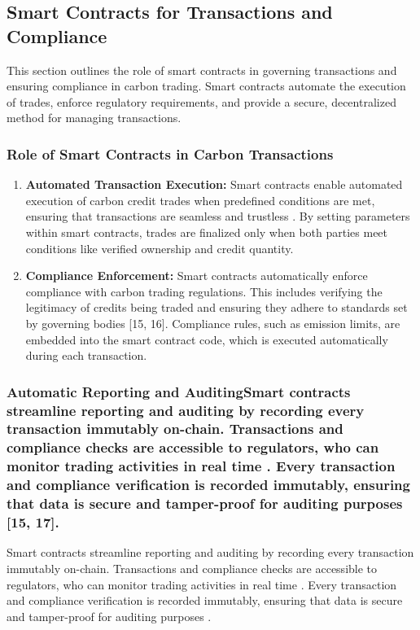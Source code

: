\documentclass[preprint,12pt]{elsarticle}
\begin{document}
\subsection{Smart Contracts for Transactions and Compliance}
This section outlines the role of smart contracts in governing transactions and ensuring compliance in carbon trading. Smart contracts automate the execution of trades, enforce regulatory requirements, and provide a secure, decentralized method for managing transactions.
\subsubsection{Role of Smart Contracts in Carbon Transactions}
\begin{enumerate}
    \item \textbf{Automated Transaction Execution:}
Smart contracts enable automated execution of carbon credit trades when predefined conditions are met, ensuring that transactions are seamless and trustless \citep{buterin2014next}. By setting parameters within smart contracts, trades are finalized only when both parties meet conditions like verified ownership and credit quantity.
\item \textbf{Compliance Enforcement:}
Smart contracts automatically enforce compliance with carbon trading regulations. This includes verifying the legitimacy of credits being traded and ensuring they adhere to standards set by governing bodies [15, 16]. Compliance rules, such as emission limits, are embedded into the smart contract code, which is executed automatically during each transaction.
\end{enumerate}
\subsubsection{Automatic Reporting and AuditingSmart contracts streamline reporting and auditing by recording every transaction immutably on-chain. Transactions and compliance checks are accessible to regulators, who can monitor trading activities in real time \citep{parikh2022smart}. Every transaction and compliance verification is recorded immutably, ensuring that data is secure and tamper-proof for auditing purposes [15, 17].}
Smart contracts streamline reporting and auditing by recording every transaction immutably on-chain. Transactions and compliance checks are accessible to regulators, who can monitor trading activities in real time \citep{parikh2022smart}. Every transaction and compliance verification is recorded immutably, ensuring that data is secure and tamper-proof for auditing purposes \citep{wong2019blockchain,tapscott2016blockchain}.
\end{document}
